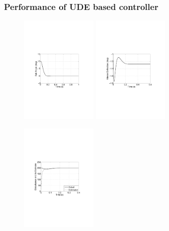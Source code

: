 \documentclass[table,10pt,red]{beamer}	%
\begin{document}
\begin{frame}
\frametitle{Performance of UDE based controller}
\begin{figure}
\includegraphics[width=3.7cm]{fig2a}
\includegraphics[width=3.7cm]{fig2b}
\begin{center}
\includegraphics[width=3.7cm]{fig2c}
\end{center}
\end{figure}

\end{frame}
\end{document}
